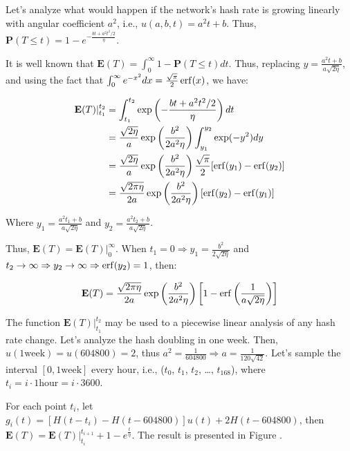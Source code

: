 Let's analyze what would happen if the network's hash rate is growing linearly with angular coefficient $a^2$, i.e., $u(a, b, t) = a^2t + b$. Thus, $\mathbf{P}(T \leq t) = 1 - e^{-\frac{bt + a^2t^2/2}{\eta}}$.

It is well known that $\mathbf{E}(T) = \int_{0}^{\infty} 1 - \mathbf{P}(T \leq t) dt$. Thus, replacing $y = \frac{a^2 t + b}{a \sqrt{2 \eta}}$, and using the fact that $\int_0^\infty e^{-x^2} dx = \frac{\sqrt{\pi}}{2} \operatorname{erf}(x)$, we have:

\begin{align}
\mathbf{E}(T)|_{t_1}^{t_2} &= \int_{t_1}^{t_2} \exp \left( - \frac{bt + a^2 t^2/2}{\eta} \right) dt \nonumber \\
	&= \frac{\sqrt{2 \eta}}{a} \exp \left( \frac{b^2}{2a^2 \eta} \right) \int_{y_1}^{y_2}  \exp(-y^2) dy \nonumber \\
	&= \frac{\sqrt{2 \eta}}{a} \exp \left( \frac{b^2}{2a^2 \eta} \right) \frac{\sqrt{\pi}}{2} [\operatorname{erf}(y_1) - \operatorname{erf}(y_2)] \nonumber \\
	&= \frac{\sqrt{2 \pi \eta}}{2a} \exp \left( \frac{b^2}{2a^2 \eta} \right) \left[\operatorname{erf}(y_2) - \operatorname{erf}(y_1) \right]
\end{align}

Where $y_1 = \frac{a^2 t_1 + b}{a \sqrt{2 \eta}}$ and $y_2 = \frac{a^2 t_2 + b}{a \sqrt{2 \eta}}$.

Thus, $\mathbf{E}(T) = \mathbf{E}(T)|_0^\infty$. When $t_1 = 0 \Rightarrow y_1 = \frac{b^2}{2 \sqrt{2 \eta}}$ and $t_2 \rightarrow \infty \Rightarrow y_2 \rightarrow \infty \Rightarrow \operatorname{erf}(y_2) = 1$, then:

$$
\mathbf{E}(T) = \frac{\sqrt{2 \pi \eta}}{2a} \exp \left( \frac{b^2}{2a^2 \eta} \right) \left[1 - \operatorname{erf}\left(\frac{1}{a \sqrt{2 \eta}}\right)\right]
$$

The function $\mathbf{E}(T)|_{t_1}^{t_2}$ may be used to a piecewise linear analysis of any hash rate change. Let's analyze the hash doubling in one week. Then, $u(1 \text{week}) = u(604800) = 2$, thus $a^2 = \frac{1}{604800} \Rightarrow a = \frac{1}{120 \sqrt{42}}$. Let's sample the interval $[0, 1 \text{week}]$ every hour, i.e., ($t_0$, $t_1$, $t_2$, \dots, $t_168$), where $t_i = i \cdot 1 \text{hour} = i \cdot 3600$.

For each point $t_i$, let $g_i(t) = [H(t-t_i) - H(t-604800)] u(t) + 2 H(t-604800)$, then $\mathbf{E}(T) = \mathbf{E}(T)|_{t_i}^{t_{i+1}} + 1 - e^{\frac{t}{\eta}}$. The result is presented in Figure .

